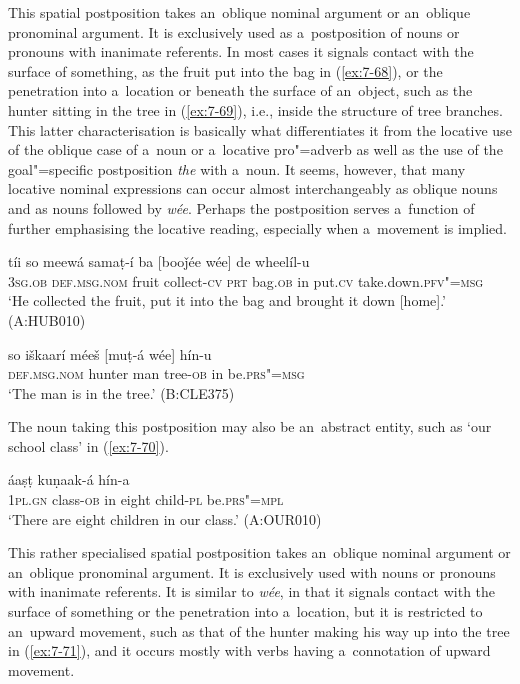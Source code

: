  This spatial postposition takes an~oblique nominal argument or an~oblique pronominal argument. It is exclusively used as a~postposition of nouns or pronouns with inanimate referents. In most cases it signals contact with the surface of something, as the fruit put into the bag in (\ref{ex:7-68}), or the penetration into a~location or beneath the surface of an~object, such as the hunter sitting in the tree in (\ref{ex:7-69}), i.e., inside the structure of tree branches. This latter characterisation is basically what differentiates it from the locative use of the oblique case of a~noun or a~locative pro"=adverb as well as the use of the goal"=specific postposition \textit{the} with a~noun. It seems, however, that many locative nominal expressions can occur almost interchangeably as oblique nouns and as nouns followed by \textit{wée}. Perhaps the postposition serves a~function of further emphasising the locative reading, especially when a~movement is implied.

\begin{exe}
\ex
\label{ex:7-68}
\gll tíi so meewá samaṭ-í ba [booǰée wée] de wheelíl-u \\
\textsc{3sg.ob} \textsc{def.msg.nom} fruit collect-\textsc{cv} \textsc{prt} bag.\textsc{ob} in  put.\textsc{cv} take.down.\textsc{pfv"=msg }\\
\glt `He collected the fruit, put it into the bag and brought it down [home].' (A:HUB010)
\end{exe}
\begin{exe}
\ex
\label{ex:7-69}
\gll so iškaarí méeš [muṭ-á wée] hín-u \\
\textsc{def.msg.nom} hunter man tree-\textsc{ob} in be.\textsc{prs"=msg} \\
\glt `The man is in the tree.' (B:CLE375)
\end{exe}

The noun taking this postposition may also be an~abstract entity, such as `our school class' in (\ref{ex:7-70}).

\begin{exe}
\ex
\label{ex:7-70}
 áaṣṭ kuṇaak-á hín-a \\
\textsc{1pl.gn} class-\textsc{ob} in eight child-\textsc{pl}  be.\textsc{prs"=mpl} \\
\glt `There are eight children in our class.' (A:OUR010)
\end{exe}


   This rather specialised spatial postposition takes an~oblique nominal argument or an~oblique pronominal argument. It is exclusively used with nouns or pronouns with inanimate referents. It is similar to \textit{wée}, in that it signals contact with the surface of something or the penetration into a~location, but it is restricted to an~upward movement, such as that of the hunter making his way up into the tree in (\ref{ex:7-71}), and it occurs mostly with verbs having a~connotation of upward movement. 

